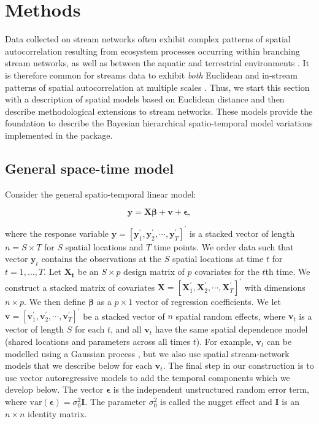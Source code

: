 \section{Methods}
\label{sec:met}

Data collected on stream networks often exhibit complex patterns of spatial autocorrelation resulting from ecosystem processes occurring within branching stream networks, as well as between the aquatic and terrestrial environments \citep{peterson2013modelling}. 
It is therefore common for streams data to exhibit \textit{both} Euclidean and in-stream patterns of spatial autocorrelation at multiple scales \citep{peterson2006patterns, peterson2010mixed}. Thus, we start this section with a description of spatial models based on Euclidean distance and then describe methodological extensions to stream networks. These models provide the foundation to describe the Bayesian hierarchical spatio-temporal model variations implemented in the  package. 

\noindent 
\subsection*{General space-time model}

Consider the general spatio-temporal linear model:

\begin{equation}
\pmb{y} = \pmb{X}\pmb{\beta} + \pmb{v} + \pmb{\epsilon},
\label{eq:lm0}
\end{equation}

\noindent where the response variable $\pmb{y} = [\pmb{y}_1^{'}, \pmb{y}_2^{'},\cdots,\pmb{y}_T^{'}]^{'}$ is a stacked vector of length $n = S\times T$ for $S$ spatial locations and $T$ time points. 
We order data such that vector $\pmb{y}_t$ contains the observations at the $S$ spatial locations at time $t$ for $t = 1, \ldots, T$.
Let $\pmb{X_t}$ be an $S \times p$ design matrix of $p$ covariates for the $t$th time.
We construct a stacked matrix of covariates 
$\pmb{X} = [\pmb{X}_1^{'}, \pmb{X}_2^{'},\cdots,\pmb{X}_T^{'}]^{'}$ with dimensions $n \times p$. 
We then define $\pmb{\beta}$ as a $p \times 1$ vector of regression coefficients.
We let $\pmb{v} = [\pmb{v}_1^{'}, \pmb{v}_2^{'},\cdots,\pmb{v}_T^{'}]^{'}$ be a stacked vector of $n$ spatial random effects, where $\pmb{v}_t$ is a  vector of length $S$ for each $t$, and all $\pmb{v}_t$ have the same spatial dependence model (shared locations and parameters across all times $t$). For example, $\pmb{v}_t$ can be modelled using a Gaussian process \citep{banerjee2014hierarchical}, but we also use spatial stream-network models that we describe below for each $\pmb{v}_t$. The final step in our construction is to use vector autoregressive models to add the temporal components which we develop below. %
The vector $\pmb{\epsilon}$ is the independent unstructured random error term, where $\textrm{var}(\pmb{\epsilon}) = \sigma^2_0\pmb{I}$. The parameter $\sigma_{0}^2$ is called the nugget effect and $\pmb{I}$ is an $n \times n$ identity matrix.


